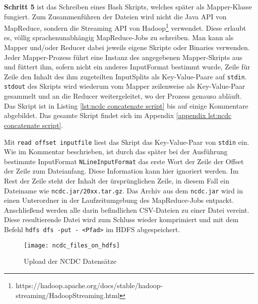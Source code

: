 \textbf{Schritt 5} ist das Schreiben eines Bash Skripts, welches später als Mapper-Klasse fungiert. Zum Zusammenführen der Dateien wird nicht die Java API von MapReduce, sondern die Streaming API von Hadoop\footnote{https://hadoop.apache.org/docs/stable/hadoop-streaming/HadoopStreaming.html} verwendet. Diese erlaubt es, völlig sprachenunabhängig MapReduce-Jobs zu schreiben. Man kann als Mapper und/oder Reducer dabei jeweils eigene Skripte oder Binaries verwenden. Jeder Mapper-Prozess führt eine Instanz des angegebenen Mapper-Skripts aus und füttert ihm, sofern nicht ein anderes InputFormat bestimmt wurde, Zeile für Zeile den Inhalt des ihm zugeteilten InputSplits als Key-Value-Paare auf \verb|stdin|. \verb|stdout| des Skripts wird wiederum vom Mapper zeilenweise als Key-Value-Paar gesammelt und an die Reducer weitergeleitet, wo der Prozess genauso abläuft. Das Skript ist in Listing \ref{lst:ncdc concatenate script} bis auf einige Kommentare abgebildet. Das gesamte Skript findet sich im Appendix \ref{appendix lst:ncdc concatenate script}.    



Mit \verb|read offset inputfile| liest das Skript das Key-Value-Paar von \verb|stdin| ein. Wie im Kommentar beschrieben, ist durch das später bei der Ausführung bestimmte InputFormat \verb|NLineInputFormat| das erste Wort der Zeile der Offset der Zeile zum Dateianfang. Diese Information kann hier ignoriert werden. Im Rest der Zeile steht der Inhalt der ürsprünglichen Zeile, in diesem Fall ein Dateiname wie \verb|ncdc.jar/20xx.tar.gz|. 
Das Archiv aus dem \verb|ncdc.jar| wird in einen Unterordner in der Laufzeitumgebung des MapReduce-Jobs entpackt. Anschließend werden alle darin befindlichen CSV-Dateien zu einer Datei vereint. Diese resultierende Datei wird zum Schluss wieder komprimiert und mit dem Befehl \verb|hdfs dfs -put - <Pfad>| im HDFS abgespeichert. 

\begin{figure}[ht]
    \centering
    \texttt{[image: ncdc\_files\_on\_hdfs]}
    \caption[Upload der NCDC Datensätze]{Upload der NCDC Datensätze}
    \label{fig:ncdc files hdfs}
\end{figure}








